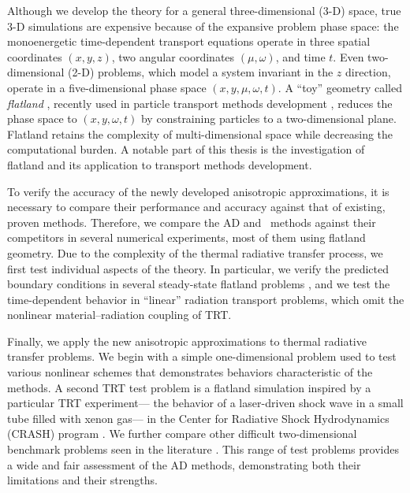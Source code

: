 Although we develop the theory for a general three-dimensional (3-D) space,
true \mbox{3-D} simulations are expensive because of the expansive problem phase
space: the monoenergetic time-dependent transport equations operate in three
spatial coordinates $(x,y,z)$,
two angular coordinates $(\mu,\omega)$, and time $t$.
Even two-dimensional (2-D)
problems, which model a system invariant in the $z$ direction, operate in  a
five-dimensional phase space $(x,y,\mu,\omega,t)$. A ``toy'' geometry called
\emph{flatland}
\cite{Abb1884}, recently used in particle transport methods development
\cite{Asa2008,Lar2009c},
reduces the phase space to $(x,y,\omega,t)$ by constraining particles to a
two-dimensional plane. Flatland retains the complexity of multi-dimensional
space while decreasing the computational burden. A notable part of this thesis
is the investigation of flatland and its application to transport methods
development.

To verify the accuracy of the newly developed anisotropic approximations, it is
necessary to
compare their performance and accuracy against that of existing, proven methods.
Therefore, we compare the AD and \APone\ methods against their competitors in several numerical
experiments, most of them using flatland geometry. Due to the complexity of
the thermal radiative transfer process, we first test individual aspects of the
theory. In particular, we verify the predicted boundary conditions in several
steady-state flatland problems \cite{Joh2011a}, and we test the time-dependent
behavior in ``linear'' radiation transport problems, which omit the nonlinear
material--radiation coupling of TRT.

Finally, we apply the new anisotropic approximations to thermal radiative
transfer problems. We begin with a simple one-dimensional problem used to test
various nonlinear schemes \cite{Rau2005} that demonstrates behaviors
characteristic of the methods. A second TRT test problem is a flatland simulation
\cite{Joh2011} inspired by a particular TRT experiment---%
the behavior of a laser-driven shock wave in a small tube filled with xenon
gas---%
in the Center for Radiative Shock Hydrodynamics (CRASH) program
\cite{Crash2010}. We further compare other difficult two-dimensional
benchmark problems seen in the literature \cite{Mou2006}.
This range of test problems provides a wide and
fair assessment of the AD methods, demonstrating both their limitations and
their strengths.

